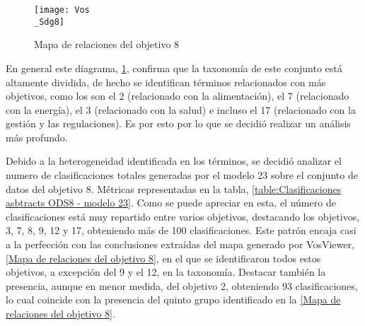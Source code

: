 \begin{figure}[H]
    \centering
    \texttt{[image: Vos\\\_Sdg8]}
    \captionsetup{justification=centering}
    \caption{Mapa de relaciones del objetivo 8}
    \label{Mapa de relaciones del objetivo 8}
\end{figure}

En general este diagrama, \cref{Mapa de relaciones del objetivo 8}, confirma que la
taxonomía de este conjunto está altamente dividida, de hecho se identifican
términos relacionados con más objetivos, como los son el 2 (relacionado con la
alimentación), el 7 (relacionado con la energía), el 3 (relacionado con la
salud) e incluso el 17 (relacionado con la gestión y las regulaciones). Es por
esto por lo que se decidió realizar un análisis más profundo.

Debido a la heterogeneidad identificada en los términos, se
decidió analizar el numero de clasificaciones totales generadas por el modelo 23
sobre el conjunto de datos del objetivo 8. Métricas representadas en la tabla,
\cref{table:Clasificaciones asbtracts ODS8 - modelo 23}. Como se puede apreciar
en esta, el número de clasificaciones está muy repartido
entre varios objetivos, destacando los objetivos, 3, 7, 8, 9, 12 y 17,
obteniendo más de 100 clasificaciones. Este patrón encaja casi a la perfección
con las conclusiones extraídas del mapa generado por VosViewer, \cref{Mapa de
relaciones del objetivo 8}, en el que se identificaron todos estos objetivos, a
excepción del 9 y el 12, en la taxonomía. Destacar también la presencia, aunque
en menor medida, del objetivo 2, obteniendo 93 clasificaciones, lo cual coincide
con la presencia del quinto grupo identificado en la \cref{Mapa de relaciones
del objetivo 8}.

